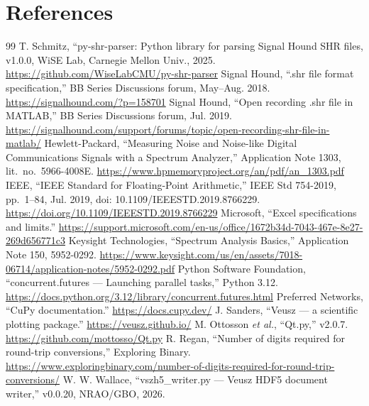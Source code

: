 \documentclass[11pt,a4paper]{article}
\begin{document}
\section*{References}
\begin{thebibliography}{99}
 T. Schmitz, ``py-shr-parser: Python library for parsing Signal Hound SHR files, v1.0.0, WiSE Lab, Carnegie Mellon Univ., 2025. \url{https://github.com/WiseLabCMU/py-shr-parser}
 Signal Hound, ``.shr file format specification,'' BB Series Discussions forum, May--Aug. 2018. \url{https://signalhound.com/?p=158701}
 Signal Hound, ``Open recording .shr file in MATLAB,'' BB Series Discussions forum, Jul. 2019. \url{https://signalhound.com/support/forums/topic/open-recording-shr-file-in-matlab/}
 Hewlett-Packard, ``Measuring Noise and Noise-like Digital Communications Signals with a Spectrum Analyzer,'' Application Note 1303, lit.\ no.\ 5966-4008E. \url{https://www.hpmemoryproject.org/an/pdf/an_1303.pdf}
 IEEE, ``IEEE Standard for Floating-Point Arithmetic,'' IEEE Std 754-2019, pp.~1--84, Jul. 2019, doi: 10.1109/IEEESTD.2019.8766229. \url{https://doi.org/10.1109/IEEESTD.2019.8766229}
 Microsoft, ``Excel specifications and limits.'' \url{https://support.microsoft.com/en-us/office/1672b34d-7043-467e-8e27-269d656771c3}
 Keysight Technologies, ``Spectrum Analysis Basics,'' Application Note 150, 5952-0292. \url{https://www.keysight.com/us/en/assets/7018-06714/application-notes/5952-0292.pdf}
 Python Software Foundation, ``concurrent.futures --- Launching parallel tasks,'' Python 3.12. \url{https://docs.python.org/3.12/library/concurrent.futures.html}
 Preferred Networks, ``CuPy documentation.'' \url{https://docs.cupy.dev/}
 J. Sanders, ``Veusz --- a scientific plotting package.'' \url{https://veusz.github.io/}
 M. Ottosson \emph{et al.}, ``Qt.py,'' v2.0.7. \url{https://github.com/mottosso/Qt.py}
 R. Regan, ``Number of digits required for round-trip conversions,'' Exploring Binary. \url{https://www.exploringbinary.com/number-of-digits-required-for-round-trip-conversions/}
 W. W. Wallace, ``vszh5\_writer.py --- Veusz HDF5 document writer,'' v0.0.20, NRAO/GBO, 2026.
\end{thebibliography}
\end{document}
